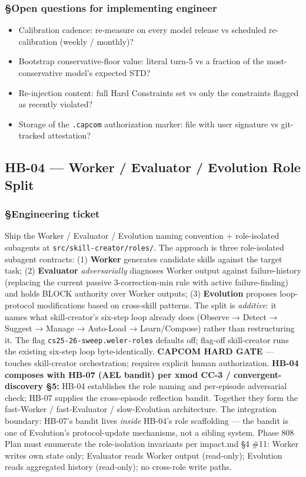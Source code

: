 \documentclass[11pt,letterpaper]{article}
\providecommand{\tightlist}{\setlength{\itemsep}{0pt}\setlength{\parskip}{0pt}}
\begin{document}
\subsubsection{§Open questions for implementing
engineer}

\begin{itemize}
\tightlist
\item
  Calibration cadence: re-measure on every model release vs scheduled
  re-calibration (weekly / monthly)?
\item
  Bootstrap conservative-floor value: literal turn-5 vs a fraction of
  the most-conservative model's expected STD?
\item
  Re-injection content: full Hard Constraints set vs only the
  constraints flagged as recently violated?
\item
  Storage of the \texttt{.capcom} authorization marker: file with user
  signature vs git-tracked attestation?
\end{itemize}


\subsection{HB-04 — Worker / Evaluator / Evolution Role Split}
\subsubsection{§Engineering ticket}

Ship the Worker / Evaluator / Evolution naming convention +
role-isolated subagents at \texttt{src/skill-creator/roles/}. The
approach is three role-isolated subagent contracts: (1) \textbf{Worker}
generates candidate skills against the target task; (2)
\textbf{Evaluator} \emph{adversarially} diagnoses Worker output against
failure-history (replacing the current passive 3-correction-min rule
with active failure-finding) and holds BLOCK authority over Worker
outputs; (3) \textbf{Evolution} proposes loop-protocol modifications
based on cross-skill patterns. The split is \emph{additive}: it names
what skill-creator's six-step loop already does (Observe → Detect →
Suggest → Manage → Auto-Load → Learn/Compose) rather than restructuring
it. The flag \texttt{cs25-26-sweep.weler-roles} defaults off; flag-off
skill-creator runs the existing six-step loop byte-identically.
\textbf{CAPCOM HARD GATE} --- touches skill-creator orchestration;
requires explicit human authorization. \textbf{HB-04 composes with HB-07
(AEL bandit) per xmod CC-3 / convergent-discovery §5:} HB-04 establishes
the role naming and per-episode adversarial check; HB-07 supplies the
cross-episode reflection bandit. Together they form the fast-Worker /
fast-Evaluator / slow-Evolution architecture. The integration boundary:
HB-07's bandit lives \emph{inside} HB-04's role scaffolding --- the
bandit is one of Evolution's protocol-update mechanisms, not a sibling
system. Phase 808 Plan must enumerate the role-isolation invariants per
impact.md §4 \#11: Worker writes own state only; Evaluator reads Worker
output (read-only); Evolution reads aggregated history (read-only); no
cross-role write paths.
\end{document}
